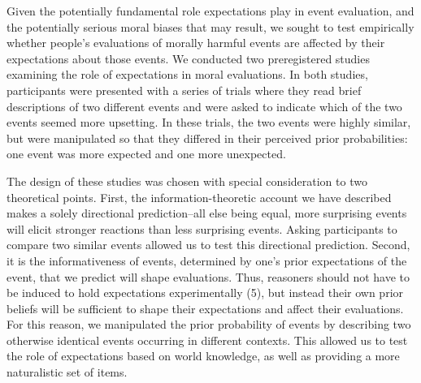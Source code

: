 \documentclass[9pt,twocolumn,twoside,lineno]{pnas-new}
\begin{document}
Given the potentially fundamental role expectations play in event
evaluation, and the potentially serious moral biases that may result, we
sought to test empirically whether people's evaluations of morally
harmful events are affected by their expectations about those events. We
conducted two preregistered studies examining the role of expectations
in moral evaluations. In both studies, participants were presented with
a series of trials where they read brief descriptions of two different
events and were asked to indicate which of the two events seemed more
upsetting. In these trials, the two events were highly similar, but were
manipulated so that they differed in their perceived prior
probabilities: one event was more expected and one more unexpected.

The design of these studies was chosen with special consideration to two
theoretical points. First, the information-theoretic account we have
described makes a solely directional prediction--all else being equal,
more surprising events will elicit stronger reactions than less
surprising events. Asking participants to compare two similar events
allowed us to test this directional prediction. Second, it is the
informativeness of events, determined by one's prior expectations of the
event, that we predict will shape evaluations. Thus, reasoners should
not have to be induced to hold expectations experimentally (5), but
instead their own prior beliefs will be sufficient to shape their
expectations and affect their evaluations. For this reason, we
manipulated the prior probability of events by describing two otherwise
identical events occurring in different contexts. This allowed us to
test the role of expectations based on world knowledge, as well as
providing a more naturalistic set of items.
\end{document}
